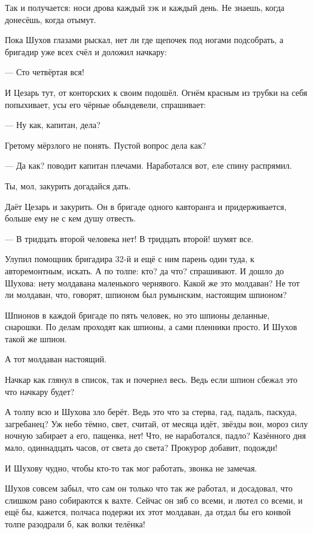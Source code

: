 Так и получается: носи дрова каждый зэк и каждый день. Не знаешь, когда донесёшь, когда отымут.

Пока Шухов глазами рыскал, нет ли где щепочек под ногами подсобрать, а бригадир уже всех счёл
и доложил начкару:

--- Сто четвёртая \dash вся!

И Цезарь тут, от конторских к своим подошёл. Огнём красным из трубки на себя попыхивает, усы
его чёрные обындевели, спрашивает:

--- Ну как, капитан, дела?

Гретому мёрзлого не понять. Пустой вопрос \dash дела как?

--- Да как? \dash поводит капитан плечами. \Dash Наработался вот, еле спину распрямил.

Ты, мол, закурить догадайся дать.

Даёт Цезарь и закурить. Он в бригаде одного кавторанга и придерживается, больше ему не с кем
душу отвесть.

--- В тридцать второй человека нет! В тридцать второй! \dash шумят все.

Улупил помощник бригадира 32-й и ещё с ним парень один \dash туда, к авторемонтным, искать. А по
толпе: кто? да что? \dash спрашивают. И дошло до Шухова: нету молдавана маленького чернявого.
Какой же это молдаван? Не тот ли молдаван, что, говорят, шпионом был румынским, настоящим
шпионом?

Шпионов \dash в каждой бригаде по пять человек, но это шпионы деланные, снарошки. По делам
проходят как шпионы, а сами пленники просто. И Шухов такой же шпион.

А тот молдаван \dash настоящий.

Начкар как глянул в список, так и почернел весь. Ведь если шпион сбежал \dash это что начкару
будет?

А толпу всю и Шухова зло берёт. Ведь это что за стерва, гад, падаль, паскуда, загребанец? Уж
небо тёмно, свет, считай, от месяца идёт, звёзды вон, мороз силу ночную забирает \dash а его,
пащенка, нет! Что, не наработался, падло? Казённого дня мало, одиннадцать часов, от света до
света? Прокурор добавит, подожди!

И Шухову чудно, чтобы кто-то так мог работать, звонка не замечая.

Шухов совсем забыл, что сам он только что так же работал, \dash и досадовал, что слишком рано
собираются к вахте. Сейчас он зяб со всеми, и лютел со всеми, и ещё бы, кажется, полчаса
подержи их этот молдаван, да отдал бы его конвой толпе \dash разодрали б, как волки телёнка!

